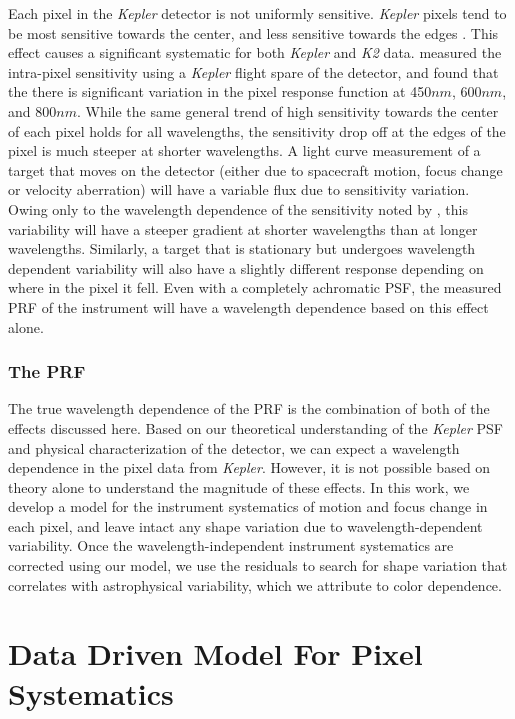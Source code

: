 \documentclass[iop]{emulateapj}
\newcommand{\kepler}{\emph{Kepler}\xspace}
\newcommand{\ktwo}{\emph{K2}\xspace}
\begin{document}
Each pixel in the \kepler detector is not uniformly sensitive. \kepler pixels tend to be most sensitive towards the center, and less sensitive towards the edges \citep[for further details, see][]{Bryson2010}. This effect causes a significant systematic for both \kepler and \ktwo data. \cite{vorobiev} measured the intra-pixel sensitivity using a \kepler flight spare of the detector, and found that the there is significant variation in the pixel response function at 450$nm$, 600$nm$, and 800$nm$. While the same general trend of high sensitivity towards the center of each pixel holds for all wavelengths, the sensitivity drop off at the edges of the pixel is much steeper at shorter wavelengths. A light curve measurement of a target that moves on the detector (either due to spacecraft motion, focus change or velocity aberration) will have a variable flux due to sensitivity variation. Owing only to the wavelength dependence of the sensitivity noted by \cite{vorobiev}, this variability will have a steeper gradient at shorter wavelengths than at longer wavelengths. Similarly, a target that is stationary but undergoes wavelength dependent variability will also have a slightly different response depending on where in the pixel it fell. Even with a completely achromatic PSF, the measured PRF of the instrument will have a wavelength dependence based on this effect alone.

\subsubsection{The PRF}

The true wavelength dependence of the PRF is the combination of both of the effects discussed here. Based on our theoretical understanding of the \kepler PSF and physical characterization of the detector, we can expect a wavelength dependence in the pixel data from \kepler. However, it is not possible based on theory alone to understand the magnitude of these effects. In this work, we develop a model for the instrument systematics of motion and focus change in each pixel, and leave intact any shape variation due to wavelength-dependent variability. Once the wavelength-independent instrument systematics are corrected using our model, we use the residuals to search for shape variation that correlates with astrophysical variability, which we attribute to color dependence.

\section{Data Driven Model For Pixel Systematics}
\label{sec:model}
\end{document}
